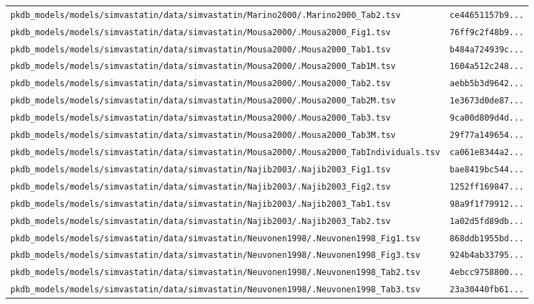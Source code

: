 \begin{longtable}{ll}
\texttt{pkdb\_models/models/simvastatin/data/simvastatin/Marino2000/.Marino2000\_Tab2.tsv} & \texttt{ce44651157b9...} \\
\texttt{pkdb\_models/models/simvastatin/data/simvastatin/Mousa2000/.Mousa2000\_Fig1.tsv} & \texttt{76ff9c2f48b9...} \\
\texttt{pkdb\_models/models/simvastatin/data/simvastatin/Mousa2000/.Mousa2000\_Tab1.tsv} & \texttt{b484a724939c...} \\
\texttt{pkdb\_models/models/simvastatin/data/simvastatin/Mousa2000/.Mousa2000\_Tab1M.tsv} & \texttt{1604a512c248...} \\
\texttt{pkdb\_models/models/simvastatin/data/simvastatin/Mousa2000/.Mousa2000\_Tab2.tsv} & \texttt{aebb5b3d9642...} \\
\texttt{pkdb\_models/models/simvastatin/data/simvastatin/Mousa2000/.Mousa2000\_Tab2M.tsv} & \texttt{1e3673d0de87...} \\
\texttt{pkdb\_models/models/simvastatin/data/simvastatin/Mousa2000/.Mousa2000\_Tab3.tsv} & \texttt{9ca00d809d4d...} \\
\texttt{pkdb\_models/models/simvastatin/data/simvastatin/Mousa2000/.Mousa2000\_Tab3M.tsv} & \texttt{29f77a149654...} \\
\texttt{pkdb\_models/models/simvastatin/data/simvastatin/Mousa2000/.Mousa2000\_TabIndividuals.tsv} & \texttt{ca061e8344a2...} \\
\texttt{pkdb\_models/models/simvastatin/data/simvastatin/Najib2003/.Najib2003\_Fig1.tsv} & \texttt{bae8419bc544...} \\
\texttt{pkdb\_models/models/simvastatin/data/simvastatin/Najib2003/.Najib2003\_Fig2.tsv} & \texttt{1252ff169847...} \\
\texttt{pkdb\_models/models/simvastatin/data/simvastatin/Najib2003/.Najib2003\_Tab1.tsv} & \texttt{98a9f1f79912...} \\
\texttt{pkdb\_models/models/simvastatin/data/simvastatin/Najib2003/.Najib2003\_Tab2.tsv} & \texttt{1a02d5fd89db...} \\
\texttt{pkdb\_models/models/simvastatin/data/simvastatin/Neuvonen1998/.Neuvonen1998\_Fig1.tsv} & \texttt{868ddb1955bd...} \\
\texttt{pkdb\_models/models/simvastatin/data/simvastatin/Neuvonen1998/.Neuvonen1998\_Fig3.tsv} & \texttt{924b4ab33795...} \\
\texttt{pkdb\_models/models/simvastatin/data/simvastatin/Neuvonen1998/.Neuvonen1998\_Tab2.tsv} & \texttt{4ebcc9758800...} \\
\texttt{pkdb\_models/models/simvastatin/data/simvastatin/Neuvonen1998/.Neuvonen1998\_Tab3.tsv} & \texttt{23a30440fb61...} \\

\end{longtable}

